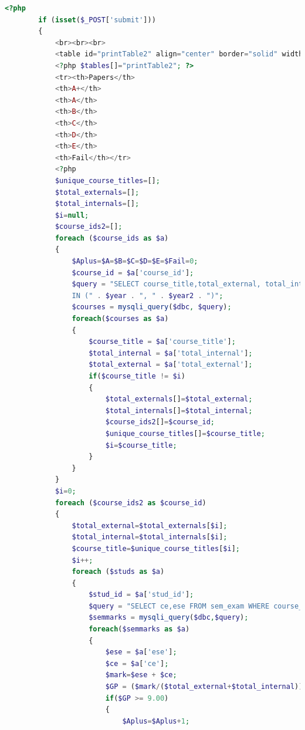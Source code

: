 \documentclass{nascproject}
\begin{document}
\begin{appendices}
\begin{lstlisting}[language=php]
<?php
        if (isset($_POST['submit']))
        {
            <br><br><br>
            <table id="printTable2" align="center" border="solid" width="50%">
            <?php $tables[]="printTable2"; ?> 
            <tr><th>Papers</th>
            <th>A+</th>
            <th>A</th>
            <th>B</th>
            <th>C</th>
            <th>D</th>
            <th>E</th>
            <th>Fail</th></tr>
            <?php
            $unique_course_titles=[];  
            $total_externals=[];
            $total_internals=[];  
            $i=null;
            $course_ids2=[];
            foreach ($course_ids as $a) 
            {
                $Aplus=$A=$B=$C=$D=$E=$Fail=0;
                $course_id = $a['course_id'];
                $query = "SELECT course_title,total_external, total_internal FROM course WHERE course_id = " . $course_id . " AND semester = " . $semester."  AND credits <> " . $credit . " AND  syllabus_intro_year
                IN (" . $year . ", " . $year2 . ")";
                $courses = mysqli_query($dbc, $query);
                foreach($courses as $a)
                {
                    $course_title = $a['course_title'];
                    $total_internal = $a['total_internal'];
                    $total_external = $a['total_external'];
                    if($course_title != $i)
                    {
                        $total_externals[]=$total_external;
                        $total_internals[]=$total_internal;
                        $course_ids2[]=$course_id;
                        $unique_course_titles[]=$course_title;
                        $i=$course_title;
                    }
                }
            }
            $i=0;
            foreach ($course_ids2 as $course_id)
            {
                $total_external=$total_externals[$i];
                $total_internal=$total_internals[$i];
                $course_title=$unique_course_titles[$i];
                $i++;   
                foreach ($studs as $a) 
                {
                    $stud_id = $a['stud_id'];
                    $query = "SELECT ce,ese FROM sem_exam WHERE course_id = ".$course_id." AND stud_id = ".$stud_id."";
                    $semmarks = mysqli_query($dbc,$query);
                    foreach($semmarks as $a)
                    {
                        $ese = $a['ese'];
                        $ce = $a['ce'];
                        $mark=$ese + $ce;
                        $GP = ($mark/($total_external+$total_internal)) * 10 ;
                        if($GP >= 9.00)
                        {
                            $Aplus=$Aplus+1;

\end{lstlisting}
\end{appendices}
\end{document}
